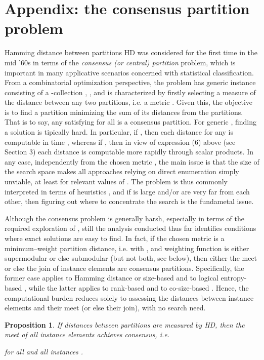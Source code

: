 \documentclass[a4paper,10pt]{article}
\newtheorem{proposition}[theorem]{Proposition}
\begin{document}
\section{Appendix: the consensus partition problem}
Hamming distance between partitions HD was considered for the first time in the mid '60s \cite{Renier1965} in terms of the \textit{consensus (or central) partition} problem, which
is important in many applicative scenarios concerned with statistical classification. From a combinatorial optimization perspective, the problem has generic instance consisting of
a -collection , , and is characterized by firstly selecting a measure of the distance between any two partitions, i.e. a metric
. Given this, the objective is to find a partition  minimizing the sum of its distances from the 
partitions. That is to say, any  satisfying  for all  is a consensus
partition. For generic , finding a solution  is tipically hard. In particular, if , then each distance  for any
 is computable in  time \cite[p. 236]{KorteVygen2002}, whereas if , then in view of expression (6) above (see Section 3) each
distance  is computable more rapidly through scalar products. In any case, independently from the chosen metric , the main issue is that the size
 of the search space  makes all approaches relying on direct enumeration simply unviable, at least for relevant values of . The
problem is thus commonly interpreted in terms of heuristics \cite{CeleuxEtAl1989,CentralPartition}, and if  is large and/or  are very far from each other, then
figuring out where to concentrate the search is the fundametal issue.

Although the consensus problem is generally harsh, especially in terms of the required exploration of , still the analysis conducted thus far identifies conditions
where exact solutions are easy to find. In fact, if the chosen metric is a minimum--weight partition distance, i.e.  with , and weighting
function  is either supermodular or else submodular (but not both, see below), then either the meet  or else the join
 of instance elements are consensus partitions. Specifically, the former case applies to Hamming distance or size-based  and to logical
entropy-based , while the latter applies to rank-based  and to co-size-based . Hence, the computational burden reduces solely to assessing the
 distances between instance elements and their meet (or else their join), with no search need.

\begin{proposition}
If distances between partitions are measured by HD, then the meet of all instance elements achieves consensus, i.e.

for all  and all instances .
\end{proposition}
\end{document}
